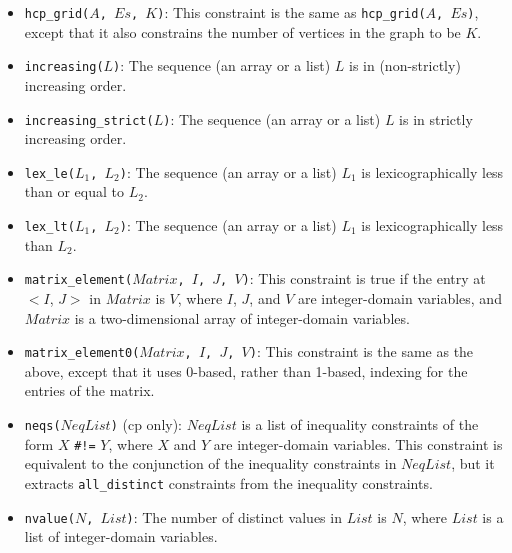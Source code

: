 \begin{itemize}
\item \texttt{hcp\_grid($A$, $Es$, $K$)}: This constraint is the same as \texttt{hcp\_grid($A$, $Es$)}, except that it also constrains the number of vertices in the graph to be $K$. 

\item \texttt{increasing($L$)}: The sequence (an array or a list) $L$ is in (non-strictly) increasing order.

\item \texttt{increasing\_strict($L$)}: The sequence (an array or a list) $L$ is in strictly increasing order.

\item \texttt{lex\_le($L_1$, $L_2$)}: The sequence (an array or a list) $L_1$ is lexicographically less than or equal to $L_2$.

\item \texttt{lex\_lt($L_1$, $L_2$)}: The sequence (an array or a list) $L_1$ is lexicographically less than $L_2$.

\item \texttt{matrix\_element($Matrix$, $I$, $J$, $V$)}: This constraint is true if the entry at $<$$I$, $J$$>$ in $Matrix$ is $V$, where $I$, $J$, and $V$ are integer-domain variables, and $Matrix$ is a two-dimensional array of integer-domain variables.

\item \texttt{matrix\_element0($Matrix$, $I$, $J$, $V$)}: This constraint is the same as the above, except that it uses 0-based, rather than 1-based, indexing for the entries of the matrix. 

\item \texttt{neqs($NeqList$)} (cp only): $NeqList$ is a list of inequality constraints of the form $X$ \verb+#!=+ $Y$, where $X$ and $Y$ are integer-domain variables. This constraint is equivalent to the conjunction of the inequality constraints in $NeqList$, but it extracts \texttt{all\_distinct} constraints from the inequality constraints. 

\item \texttt{nvalue($N$, $List$)}: The number of distinct values in $List$ is $N$, where $List$ is a list of integer-domain variables.


\end{itemize}
